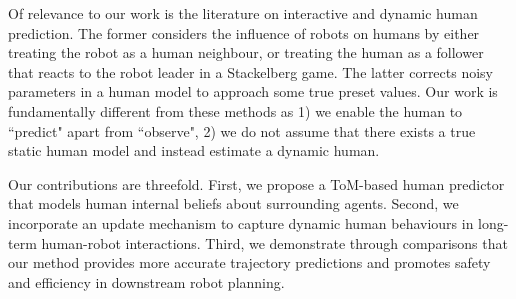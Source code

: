 
Of relevance to our work is the literature on interactive and dynamic human prediction. 
The former considers the influence of robots on humans by either treating the robot as a human neighbour, or treating the human as a follower that reacts to the robot leader in a Stackelberg game. 
The latter corrects noisy parameters in a human model to approach some true preset values. 
Our work is fundamentally different from these methods as 1) we enable the human to ``predict" apart from ``observe", 2) we do not assume that there exists a true static human model and instead estimate a dynamic human.

Our contributions are threefold. 
First, we propose a ToM-based human predictor that models human internal beliefs about surrounding agents. 
Second, we incorporate an update mechanism to capture dynamic human behaviours in long-term human-robot interactions. 
Third, we demonstrate through comparisons that our method provides more accurate trajectory predictions and promotes safety and efficiency in downstream robot planning.